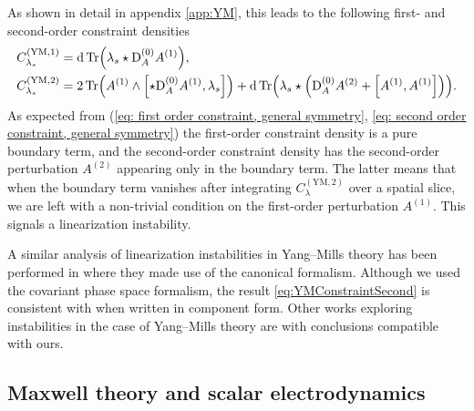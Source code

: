 \documentclass[]{jkpaper}
\theoremstyle{plain}
\theoremstyle{definition}
\newcommand{\DD}[1]{\text{D}_A#1}
\begin{document}
As shown in detail in appendix \ref{app:YM},
this leads to the following first- and second-order constraint densities
\begin{align}
    \label{eq:YMConstraintFirst}
    C_{\lambda_s}^{(\text{YM},1)} &= \dd \Tr(\lambda_s \star \DD^{(0)} A^{(1)}), \\
    C_{\lambda_s}^{(\text{YM},2)} &= 2\Tr(A^{(1)} \wedge \comm{\star \DD^{(0)} A^{(1)}}{\lambda_s} ) 
    + \dd \Tr( \lambda_s \star \left(\DD^{(0)} A^{(2)} + \comm{A^{(1)}}{A^{(1)}} \right)).
    \label{eq:YMConstraintSecond}
\end{align}
As expected from (\ref{eq: first order constraint, general symmetry}, \ref{eq: second order constraint, general symmetry}) the first-order constraint density is a pure boundary term, and the second-order constraint density has the second-order perturbation $A^{(2)}$ appearing only in the boundary term. The latter means that when the boundary term vanishes after integrating $C_\lambda^{(\text{YM},2)}$ over a spatial slice, we are left with a non-trivial condition on the first-order perturbation $A^{(1)}$. This signals a linearization instability.

A similar analysis of linearization instabilities in Yang--Mills theory has been performed in \cite{Moncrief:1977hy} where they made use of the canonical formalism. Although we used the covariant phase space formalism, the result \eqref{eq:YMConstraintSecond} is consistent with \cite[Eq.~(4.10)]{Moncrief:1977hy} when written in component form. Other works exploring instabilities in the case of Yang--Mills theory are \cite{Arms1,Arms:1979au,Altas:2021htf,Khavkine:2013iei,Arms_1981,arms1981symmetry,Arms:1986vk} with conclusions compatible with ours.


\subsection{Maxwell theory and scalar  electrodynamics}\label{ssec_QED}
\end{document}
